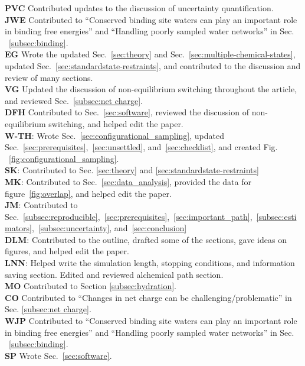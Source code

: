 \documentclass[9pt,bestpractices]{livecoms}
\begin{document}
\textbf{PVC} Contributed updates to the discussion of uncertainty quantification.\\
\textbf{JWE} Contributed to ``Conserved binding site waters can play an important role in binding free energies'' and ``Handling poorly sampled water networks'' in Sec. ~\ref{subsec:binding}.\\
\textbf{EG} Wrote the updated Sec.~\ref{sec:theory} and Sec.~\ref{sec:multiple-chemical-states},  updated Sec.~\ref{sec:standardstate-restraints}, and contributed to the discussion and review of many sections.\\
\textbf{VG} Updated the discussion of non-equilibrium switching throughout the article, and reviewed Sec.~\ref{subsec:net charge}.\\
\textbf{DFH} Contributed to Sec.~\ref{sec:software}, reviewed the discussion of non-equilibrium switching, and helped edit the paper.\\
\textbf{W-TH}: Wrote Sec.~\ref{sec:configurational_sampling}, updated Sec.~\ref{sec:prerequisites},~\ref{sec:unsettled}, and~\ref{sec:checklist}, and created Fig. ~\ref{fig:configurational_sampling}.\\
\textbf{SK}: Contributed to Sec. \ref{sec:theory} and \ref{sec:standardstate-restraints}  \\
\textbf{MK}: Contributed to Sec.~\ref{sec:data_analysis}, provided the data for figure~\ref{fig:overlap}, and helped edit the paper.\\
\textbf{JM}: Contributed to Sec.~\ref{subsec:reproducible},~\ref{sec:prerequisites},~\ref{sec:important_path},~\ref{subsec:estimators},~\ref{subsec:uncertainty}, and~\ref{sec:conclusion}\\
\textbf{DLM}: Contributed to the outline, drafted some of the sections, gave ideas on figures, and helped edit the paper.\\
\textbf{LNN}: Helped write the simulation length, stopping conditions, and information saving section. Edited and reviewed alchemical path section.\\
\textbf{MO} Contributed to Section \ref{subsec:hydration}.\\
\textbf{CO} Contributed to ``Changes in net charge can be challenging/problematic'' in Sec. \ref{subsec:net charge}. \\
\textbf{WJP} Contributed to ``Conserved binding site waters can play an important role in binding free energies'' and ``Handling poorly sampled water networks'' in Sec. ~\ref{subsec:binding}.\\
\textbf{SP} Wrote Sec.~\ref{sec:software}. \\
\end{document}
